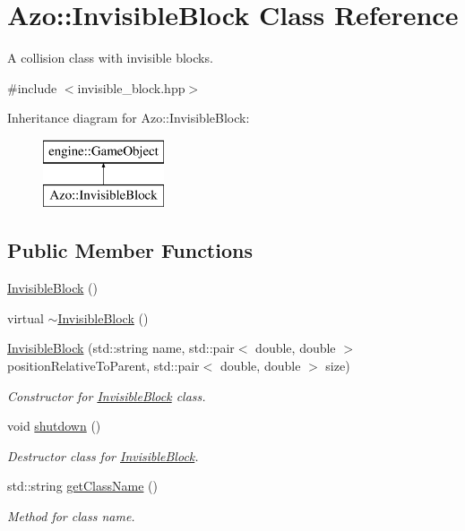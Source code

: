 \hypertarget{class_azo_1_1_invisible_block}{}\section{Azo\+:\+:Invisible\+Block Class Reference}
\label{class_azo_1_1_invisible_block}


A collision class with invisible blocks.  




{\ttfamily \#include $<$invisible\+\_\+block.\+hpp$>$}

Inheritance diagram for Azo\+:\+:Invisible\+Block\+:\begin{figure}[H]
\begin{center}
\leavevmode
\includegraphics[height=2.000000cm]{class_azo_1_1_invisible_block}
\end{center}
\end{figure}
\subsection*{Public Member Functions}
\begin{DoxyCompactItemize}
\item 
\hyperlink{class_azo_1_1_invisible_block_a75b3abaaaa5dd90bf39a83b1605dd9ad}{Invisible\+Block} ()
\item 
virtual \hyperlink{class_azo_1_1_invisible_block_a08325dc2f5ef563800beaa2a6bc73667}{$\sim$\+Invisible\+Block} ()
\item 
\hyperlink{class_azo_1_1_invisible_block_ab47f9aabb5bd98f2159b188ab4d29ede}{Invisible\+Block} (std\+::string name, std\+::pair$<$ double, double $>$ position\+Relative\+To\+Parent, std\+::pair$<$ double, double $>$ size)
\begin{DoxyCompactList}\small\item\em Constructor for \hyperlink{class_azo_1_1_invisible_block}{Invisible\+Block} class. \end{DoxyCompactList}\item 
void \hyperlink{class_azo_1_1_invisible_block_adeb8f56bc48b28236165da3ef05af0b1}{shutdown} ()
\begin{DoxyCompactList}\small\item\em Destructor class for \hyperlink{class_azo_1_1_invisible_block}{Invisible\+Block}. \end{DoxyCompactList}\item 
std\+::string \hyperlink{class_azo_1_1_invisible_block_a627cab09cdae548b6d58ceb150561a45}{get\+Class\+Name} ()
\begin{DoxyCompactList}\small\item\em Method for class name. \end{DoxyCompactList}\end{DoxyCompactItemize}
